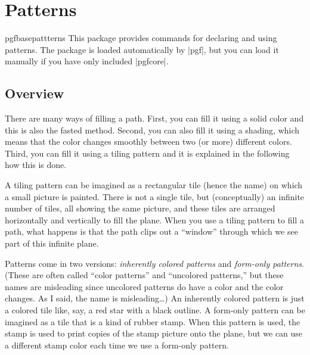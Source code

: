 %
%
%


\section{Patterns}

\label{section-patterns}

\begin{package}{pgfbasepattterns}
  This package provides commands for declaring and using patterns. The
  package is loaded automatically by 
  |pgf|, but you can load it manually if you have only included
  |pgfcore|.   
\end{package}



\subsection{Overview}

There are many ways of filling a path. First, you can fill it using a
solid color and this is also the fasted method. Second, you can also
fill it using a shading, which means that the color changes smoothly
between two (or more) different colors. Third, you can fill it using a
tiling pattern and it is explained in the following how this is done.

A tiling pattern can be imagined as a rectangular tile (hence the
name) on which a small picture is painted. There is not a single tile,
but (conceptually) an infinite number of tiles, all showing the same 
picture, and these tiles are arranged horizontally and vertically to
fill the plane. When you use a tiling pattern to fill a path, what
happens is that the path clips out a ``window'' through which we see
part of this infinite plane.

Patterns come in two versions: \emph{inherently colored patterns} and
\emph{form-only patterns}. (These are often called ``color patterns''
and ``uncolored patterns,'' but these names are misleading since
uncolored patterns do have a color and the color changes. As I said, 
the name is misleading\dots) An inherently colored pattern is just a
colored tile like, say, a red star with a black outline. A form-only
pattern can be imagined as a tile that is a kind of rubber stamp. When
this pattern is used, the stamp is used to print copies of the stamp
picture onto the plane, but we can use a different stamp color each
time we use a form-only pattern.

